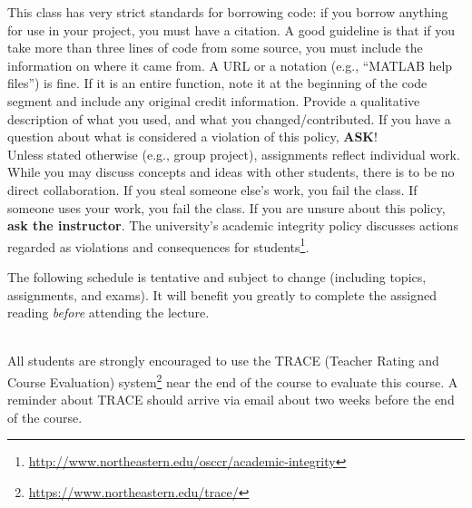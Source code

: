 \documentclass{neu_syllabus}
\begin{document}
This class has very strict standards for borrowing code: if you borrow anything for use in your project, you must have a citation.
A good guideline is that if you take more than three lines of code from some source, you must include the information on where it came from.
A URL or a notation (e.g., ``MATLAB help files'') is fine.
If it is an entire function, note it at the beginning of the code segment and include any original credit information.
Provide a qualitative description of what you used, and what you changed/contributed.
If you have a question about what is considered a violation of this policy, \textbf{ASK}!
\\

Unless stated otherwise (e.g., group project), assignments reflect individual work.
While you may discuss concepts and ideas with other students, there is to be no direct collaboration.
If you steal someone else's work, you fail the class.
If someone uses your work, you fail the class.
If you are unsure about this policy, \textbf{ask the instructor}.
The university's academic integrity policy discusses actions regarded as violations and consequences for students\footnote{\url{http://www.northeastern.edu/osccr/academic-integrity}}.

\newpage

\SyllabusClassroomEnvironment

\newpage

The following schedule is tentative and subject to change (including topics, assignments, and exams).
It will benefit you greatly to complete the assigned reading \textit{before} attending the lecture.
\\

\begin{SyllabusSchedule}
\end{SyllabusSchedule}
\\

All students are strongly encouraged to use the TRACE (Teacher Rating and Course Evaluation) system\footnote{\url{https://www.northeastern.edu/trace/}} near the end of the course to evaluate this course.
A reminder about TRACE should arrive via email about two weeks before the end of the course.
\end{document}
